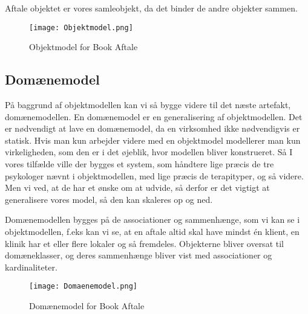 Aftale objektet er vores samleobjekt, da det binder de andre objekter sammen.

\begin{sidewaysfigure}
    \caption{Objektmodel for Book Aftale}
    \centering
        \texttt{[image: Objektmodel.png]}
    \label{system:objekt}
\end{sidewaysfigure}

\subsection{Domænemodel}
\label{domaenemodel}

På baggrund af objektmodellen kan vi så bygge videre til det næste artefakt, domænemodellen.
En domænemodel er en generalisering af objektmodellen.
Det er nødvendigt at lave en domænemodel, da en virksomhed ikke nødvendigvis er statisk.
Hvis man kun arbejder videre med en objektmodel modellerer man kun virkeligheden, som den er i det øjeblik, hvor modellen bliver konstrueret.
Så I vores tilfælde ville der bygges et system, som håndtere lige præcis de tre psykologer nævnt i objektmodellen, med lige præcis de terapityper, og så videre.
Men vi ved, at de har et ønske om at udvide, så derfor er det vigtigt at generalisere vores model, så den kan skaleres op og ned.

Domænemodellen bygges på de associationer og sammenhænge, som vi kan se i objektmodellen, f.eks kan vi se, at en aftale altid skal have mindst én klient, en klinik har et eller flere lokaler og så fremdeles.
Objekterne bliver oversat til domæneklasser, og deres sammenhænge bliver vist med associationer og kardinaliteter.

\begin{figure}[H]
    \caption{Domænemodel for Book Aftale}
    \centering
        \texttt{[image: Domaenemodel.png]}
    \label{system:domaene}
\end{figure}



